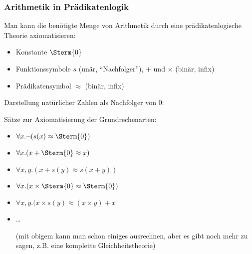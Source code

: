 \documentclass[aspectratio=1610,onlymath]{beamer}
\begin{document}
\begin{frame}\frametitle{Arithmetik in Prädikatenlogik}

Man kann die benötigte Menge von Arithmetik durch eine prädikatenlogische Theorie axiomatisieren:
\begin{itemize}
\item Konstante $\Sterm{0}$
\item Funktionssymbole $s$ (unär, "`Nachfolger"'), $+$ und $\times$ (binär, infix)
\item Prädikatensymbol $\approx$ (binär, infix)
\end{itemize}

Darstellung natürlicher Zahlen als Nachfolger von 0:\\[0.5ex]
\bigskip

Sätze zur Axiomatisierung der Grundrechenarten:
\begin{itemize}
\item $\forall x.\neg(s(x)\approx \Sterm{0})$
\item $\forall x.(x+\Sterm{0}\approx x)$ 
\item $\forall x,y.(x+s(y)\approx s(x+y))$
\item $\forall x.(x\times \Sterm{0}\approx \Sterm{0})$ 
\item $\forall x,y.(x\times s(y)\approx (x\times y)+x$
\item \ldots {\tiny (mit obigem kann man schon einiges ausrechnen, aber es gibt noch mehr zu sagen, z.B. eine komplette Gleichheitstheorie)

}
\end{itemize}

\end{frame}

\end{document}
